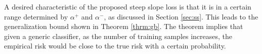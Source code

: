 A desired characteristic of the proposed steep slope loss is that it is in a certain range determined by $\alpha^{+}$ and $\alpha^{-}$, as discussed in Section \ref{sec:ss}. This leads to the generalization bound shown in Theorem \ref{thrm:gb}. The theorem implies that given a generic classifier, as the number of training samples increases, the empirical risk would be close to the true risk with a certain probability.







